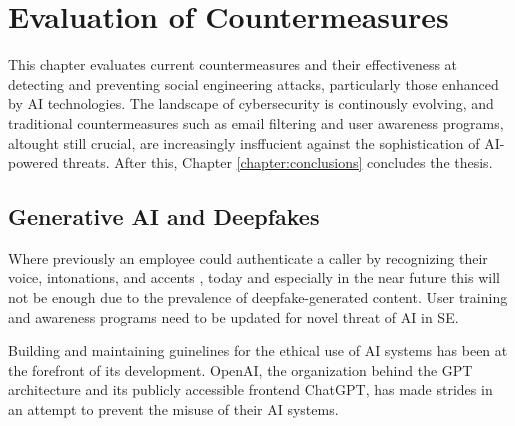 



\chapter{Evaluation of Countermeasures\label{chapter:evaluation}}
\begin{comment}

Guides:
    - Rest of the thesis (thesis max of 20 - other chapters and pages)
    - Fill the thesis with content in this chapter

TODO:
    [ ] 

What to cover:
    - OpenAI attempts to control how ChatGPT etc are used
    - Efficacy of EU and other level regulations
    - Instagram flagging content that might've been generated with AI (this is futile in the future?)
    
Literature:
    - 

\end{comment}

This chapter evaluates current countermeasures and their effectiveness at detecting and preventing social engineering attacks, particularly those enhanced by AI technologies. The landscape of cybersecurity is continously evolving, and traditional countermeasures such as email filtering and user awareness programs, altought still crucial, are increasingly insffucient against the sophistication of AI-powered threats. After this, Chapter \ref{chapter:conclusions} concludes the thesis.

\section{Generative AI and Deepfakes}

Where previously an employee could authenticate a caller by recognizing their voice, intonations, and accents \citep{mitnickArtDeceptionControlling2003}, today and especially in the near future this will not be enough due to the prevalence of deepfake-generated content. User training and awareness programs need to be updated for novel threat of AI in SE.

Building and maintaining guinelines for the ethical use of AI systems has been at the forefront of its development. OpenAI, the organization behind the GPT architecture and its publicly accessible frontend ChatGPT, has made strides in an attempt to prevent the misuse of their AI systems.

